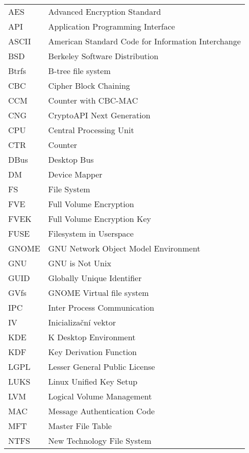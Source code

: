 
\seznamzkr

\setlength{\LTleft}{0pt}
\begin{longtable}{ll}
  AES & Advanced Encryption Standard \\
  API & Application Programming Interface \\
  ASCII & American Standard Code for Information Interchange \\
  BSD & Berkeley Software Distribution \\
  Btrfs & B-tree file system \\
  CBC & Cipher Block Chaining \\
  CCM & Counter with CBC-MAC \\
  CNG & CryptoAPI Next Generation \\
  CPU & Central Processing Unit \\
  CTR & Counter \\
  DBus & Desktop Bus \\
  DM & Device Mapper \\
  FS &  File System \\
  FVE & Full Volume Encryption \\
  FVEK & Full Volume Encryption Key \\
  FUSE & Filesystem in Userspace \\
  GNOME & GNU Network Object Model Environment \\
  GNU & GNU is Not Unix \\
  GUID & Globally Unique Identifier \\
  GVfs & GNOME Virtual file system \\
  IPC & Inter Process Communication \\
  IV & Inicializační vektor \\
  KDE & K Desktop Environment \\
  KDF & Key Derivation Function \\
  LGPL & Lesser General Public License \\
  LUKS & Linux Unified Key Setup \\
  LVM & Logical Volume Management \\
  MAC & Message Authentication Code \\
  MFT & Master File Table \\
  NTFS & New Technology File System \\

\end{longtable}
